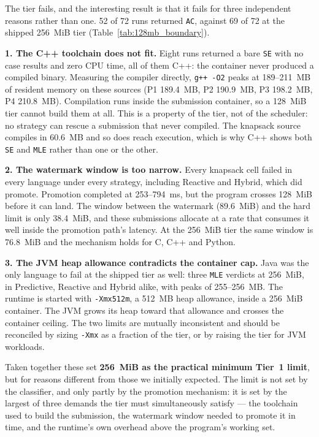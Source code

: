 \documentclass[conference]{IEEEtran}
\begin{document}
The tier fails, and the interesting result is that it fails for three independent reasons rather than one. 52 of 72 runs returned \texttt{AC}, against 69 of 72 at the shipped 256~MiB tier (Table~\ref{tab:128mb_boundary}).

\textbf{1. The C++ toolchain does not fit.} Eight runs returned a bare \texttt{SE} with no case results and zero CPU time, all of them C++: the container never produced a compiled binary. Measuring the compiler directly, \texttt{g++ -O2} peaks at 189--211~MB of resident memory on these sources (P1 189.4~MB, P2 190.9~MB, P3 198.2~MB, P4 210.8~MB). Compilation runs inside the submission container, so a 128~MiB tier cannot build them at all. This is a property of the tier, not of the scheduler: no strategy can rescue a submission that never compiled. The knapsack source compiles in 60.6~MB and so does reach execution, which is why C++ shows both \texttt{SE} and \texttt{MLE} rather than one or the other.

\textbf{2. The watermark window is too narrow.} Every knapsack cell failed in every language under every strategy, including Reactive and Hybrid, which did promote. Promotion completed at 253--794~ms, but the program crosses 128~MiB before it can land. The window between the watermark (89.6~MiB) and the hard limit is only 38.4~MiB, and these submissions allocate at a rate that consumes it well inside the promotion path's latency. At the 256~MiB tier the same window is 76.8~MiB and the mechanism holds for C, C++ and Python.

\textbf{3. The JVM heap allowance contradicts the container cap.} Java was the only language to fail at the shipped tier as well: three \texttt{MLE} verdicts at 256~MiB, in Predictive, Reactive and Hybrid alike, with peaks of 255--256~MB. The runtime is started with \texttt{-Xmx512m}, a 512~MB heap allowance, inside a 256~MiB container. The JVM grows its heap toward that allowance and crosses the container ceiling. The two limits are mutually inconsistent and should be reconciled by sizing \texttt{-Xmx} as a fraction of the tier, or by raising the tier for JVM workloads.

Taken together these set \textbf{256~MiB as the practical minimum Tier~1 limit}, but for reasons different from those we initially expected. The limit is not set by the classifier, and only partly by the promotion mechanism: it is set by the largest of three demands the tier must simultaneously satisfy --- the toolchain used to build the submission, the watermark window needed to promote it in time, and the runtime's own overhead above the program's working set.
\end{document}
